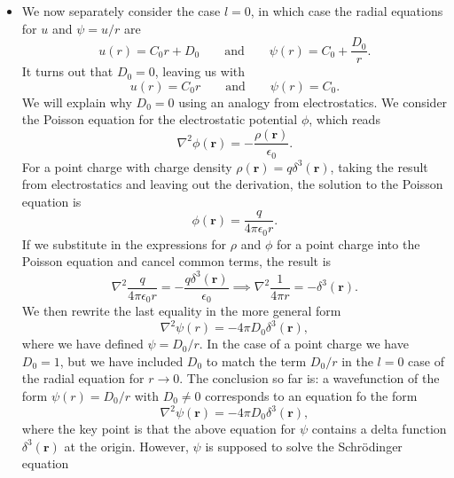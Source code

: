 \documentclass[11pt, a4paper]{article}
\renewcommand{\laplacian}{\nabla^{2}}
\newcommand{\Schro}{Schr\"{o}dinger\xspace}
\renewcommand{\vec}[1]{\bm{#1}}  %
\renewcommand{\r}{\vec{r}}  %
\newcommand{\p}{\psi}  %
\begin{document}
\begin{itemize}
    \item We now separately consider the case $ l = 0 $, in which case the radial equations for $ u $ and $ \psi = u/r $ are
    \begin{equation*}
        u(r) = C_{0}r + D_{0} \qquad \text{and} \qquad \psi(r) = C_{0} + \frac{D_{0}}{r}.
    \end{equation*}
    It turns out that $ D_{0} = 0 $, leaving us with 
    \begin{equation*}
        u(r) = C_{0}r \qquad \text{and} \qquad \psi(r) = C_{0}.
    \end{equation*}
    We will explain why $ D_{0} = 0 $ using an analogy from electrostatics. We consider the Poisson equation for the electrostatic potential $ \phi $, which reads
	\begin{equation*}
		\laplacian \phi(\r) = -\frac{\rho(\r)}{\epsilon_{0}}.
	\end{equation*}
    For a point charge with charge density $ \rho(\r) = q \delta^{3}(\r) $, taking the result from electrostatics and leaving out the derivation, the solution to the Poisson equation is
	\begin{equation*}
		\phi(\r) = \frac{q}{4\pi \epsilon_{0}r}.
	\end{equation*}
	If we substitute in the expressions for $ \rho $ and $ \phi $ for a point charge into the Poisson equation and cancel common terms, the result is
    \begin{equation*}
        \laplacian \frac{q}{4 \pi \epsilon_{0} r} = - \frac{q \delta^{3}(\r)}{\epsilon_{0}} \implies \laplacian \frac{1}{4\pi r} = - \delta^{3}(\r).
    \end{equation*}
    We then rewrite the last equality in the more general form
    \begin{equation*}
        \laplacian \psi(r) = - 4 \pi D_{0} \delta^{3}(\r),
    \end{equation*}
    where we have defined $ \psi = D_{0}/r $. In the case of a point charge we have $ D_{0} = 1 $, but we have included $ D_{0} $ to match the term $ D_{0}/r $ in the $ l = 0 $ case of the radial equation for $ r \to 0 $. The conclusion so far is: a wavefunction of the form $ \psi(r) = D_{0}/r $ with $ D_{0} \neq 0 $ corresponds to an equation fo the form 
	\begin{equation*}
		\laplacian \p(\r) = - 4 \pi D_{0} \delta^{3}(\r),
	\end{equation*}
    where the key point is that the above equation for $ \psi $ contains a delta function $ \delta^{3}(\r) $ at the origin. However, $ \psi $ is supposed to solve the \Schro equation 

\end{itemize}
\end{document}
